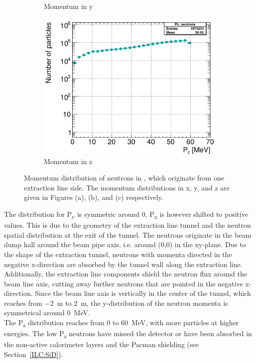 \begin{figure}[!b]
\begin{subfigure}[b]{0.32\textwidth}
   \caption{Momentum in y}
   \end{subfigure}
   \hfill
    \begin{subfigure}[b]{0.32\textwidth}
   \centering
    \includegraphics[width=\textwidth]{Figures/BeamDump/neutrons_Pz.png}
   \caption{Momentum in z}
   \end{subfigure}
   \caption[Beam dump neutron momenta in \sid]{Momentum distribution of neutrons in \sid, which originate from one extraction line side.
   The momentum distributions in x, y, and z are given in Figures (a), (b), and (c) respectively.}
   \label{fig:BeamDumps:NeutronMom}
\end{figure} 
The distribution for P\textsubscript{y} is symmetric around 0, P\textsubscript{x} is however shifted to positive values.
This is due to the geometry of the extraction line tunnel and the neutron spatial distribution at the exit of the tunnel.
The neutrons originate in the beam dump hall around the beam pipe axis, i.e. around (0,0) in the xy-plane.
Due to the shape of the extraction tunnel, neutrons with momenta directed in the negative x-direction are absorbed by the tunnel wall along the extraction line.
Additionally, the extraction line components shield the neutron flux around the beam line axis, cutting away further neutrons that are pointed in the negative x-direction.
Since the beam line axis is vertically in the center of the tunnel, which reaches from \SI{-2}{\meter} to \SI{2}{\meter}, the y-distribution of the neutron momenta is symmetrical around \SI{0}{\MeV}.
\\The P\textsubscript{z} distribution reaches from 0 to \SI{60}{\MeV}, with more particles at higher energies.
The low P\textsubscript{z} neutrons have missed the detector or have been absorbed in the non-active calorimeter layers and the Pacman shielding (see Section~\ref{ILC:SiD}).

